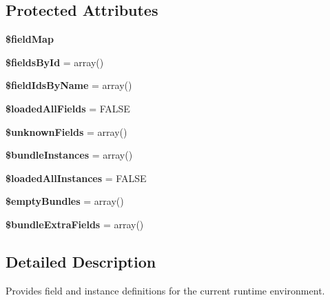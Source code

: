 \subsection*{Protected Attributes}
\begin{DoxyCompactItemize}
\item 
\hypertarget{classFieldInfo_a2ccab1a416f6becde17bd0b1e57d9e53}{
{\bfseries \$fieldMap}}
\label{classFieldInfo_a2ccab1a416f6becde17bd0b1e57d9e53}

\item 
\hypertarget{classFieldInfo_a506a0d72d0c556a60bc34731a3fcade1}{
{\bfseries \$fieldsById} = array()}
\label{classFieldInfo_a506a0d72d0c556a60bc34731a3fcade1}

\item 
\hypertarget{classFieldInfo_a3c932b00ff53eca87d9fb17092d09ba3}{
{\bfseries \$fieldIdsByName} = array()}
\label{classFieldInfo_a3c932b00ff53eca87d9fb17092d09ba3}

\item 
\hypertarget{classFieldInfo_ac34d3c522e93beb7a34eb373e594333f}{
{\bfseries \$loadedAllFields} = FALSE}
\label{classFieldInfo_ac34d3c522e93beb7a34eb373e594333f}

\item 
\hypertarget{classFieldInfo_a7f038666d298ec9a00f3d11181bdfef6}{
{\bfseries \$unknownFields} = array()}
\label{classFieldInfo_a7f038666d298ec9a00f3d11181bdfef6}

\item 
\hypertarget{classFieldInfo_a807bb867bb45167611adf47f4c501a67}{
{\bfseries \$bundleInstances} = array()}
\label{classFieldInfo_a807bb867bb45167611adf47f4c501a67}

\item 
\hypertarget{classFieldInfo_a0a6d3852cf150bb4c3a1ab30403c2bf1}{
{\bfseries \$loadedAllInstances} = FALSE}
\label{classFieldInfo_a0a6d3852cf150bb4c3a1ab30403c2bf1}

\item 
\hypertarget{classFieldInfo_a65c34a55bbcf6fb5ae44a9b27c376dd0}{
{\bfseries \$emptyBundles} = array()}
\label{classFieldInfo_a65c34a55bbcf6fb5ae44a9b27c376dd0}

\item 
\hypertarget{classFieldInfo_ac0c0c1d0d88a458e7dd9603951f075c4}{
{\bfseries \$bundleExtraFields} = array()}
\label{classFieldInfo_ac0c0c1d0d88a458e7dd9603951f075c4}

\end{DoxyCompactItemize}


\subsection{Detailed Description}
Provides field and instance definitions for the current runtime environment.

